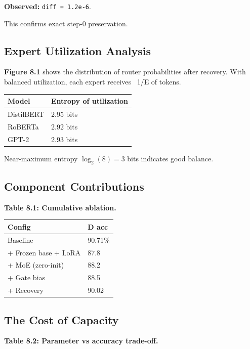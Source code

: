 \textbf{Observed:} \texttt{diff = 1.2e-6}.

This confirms exact step-0 preservation.

\subsection{Expert Utilization Analysis}

\textbf{Figure 8.1} shows the distribution of router probabilities after recovery. 
With balanced utilization, each expert receives ~1/E of tokens.

\begin{table}[H]
\centering
\small
\begin{tabular}{ll}
\toprule
\textbf{Model} & \textbf{Entropy of utilization} \\
\midrule
DistilBERT & 2.95 bits \\
RoBERTa & 2.92 bits \\
GPT-2 & 2.93 bits \\
\bottomrule
\end{tabular}
\end{table}

Near-maximum entropy $\log_2(8) = 3$ bits indicates good balance.

\subsection{Component Contributions}

\textbf{Table 8.1: Cumulative ablation.}

\begin{table}[H]
\centering
\small
\begin{tabular}{ll}
\toprule
\textbf{Config} & \textbf{D acc} \\
\midrule
Baseline & 90.71\% \\
+ Frozen base + LoRA & 87.8 \\
+ MoE (zero-init) & 88.2 \\
+ Gate bias & 88.5 \\
+ Recovery & 90.02 \\
\bottomrule
\end{tabular}
\end{table}

\subsection{The Cost of Capacity}

\textbf{Table 8.2: Parameter vs accuracy trade-off.}

